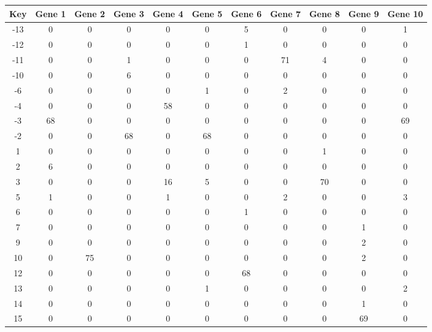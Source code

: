 \begin{tabular}{|c|c|c|c|c|c|c|c|c|c|c|}
\hline
Key & Gene 1 & Gene 2 & Gene 3 & Gene 4 & Gene 5 & Gene 6 & Gene 7 & Gene 8 & Gene 9 & Gene 10 \\
\hline
-13 & 0 & 0 & 0 & 0 & 0 & 5 & 0 & 0 & 0 & 1 \\
-12 & 0 & 0 & 0 & 0 & 0 & 1 & 0 & 0 & 0 & 0 \\
-11 & 0 & 0 & 1 & 0 & 0 & 0 & 71 & 4 & 0 & 0 \\
-10 & 0 & 0 & 6 & 0 & 0 & 0 & 0 & 0 & 0 & 0 \\
-6 & 0 & 0 & 0 & 0 & 1 & 0 & 2 & 0 & 0 & 0 \\
-4 & 0 & 0 & 0 & 58 & 0 & 0 & 0 & 0 & 0 & 0 \\
-3 & 68 & 0 & 0 & 0 & 0 & 0 & 0 & 0 & 0 & 69 \\
-2 & 0 & 0 & 68 & 0 & 68 & 0 & 0 & 0 & 0 & 0 \\
1 & 0 & 0 & 0 & 0 & 0 & 0 & 0 & 1 & 0 & 0 \\
2 & 6 & 0 & 0 & 0 & 0 & 0 & 0 & 0 & 0 & 0 \\
3 & 0 & 0 & 0 & 16 & 5 & 0 & 0 & 70 & 0 & 0 \\
5 & 1 & 0 & 0 & 1 & 0 & 0 & 2 & 0 & 0 & 3 \\
6 & 0 & 0 & 0 & 0 & 0 & 1 & 0 & 0 & 0 & 0 \\
7 & 0 & 0 & 0 & 0 & 0 & 0 & 0 & 0 & 1 & 0 \\
9 & 0 & 0 & 0 & 0 & 0 & 0 & 0 & 0 & 2 & 0 \\
10 & 0 & 75 & 0 & 0 & 0 & 0 & 0 & 0 & 2 & 0 \\
12 & 0 & 0 & 0 & 0 & 0 & 68 & 0 & 0 & 0 & 0 \\
13 & 0 & 0 & 0 & 0 & 1 & 0 & 0 & 0 & 0 & 2 \\
14 & 0 & 0 & 0 & 0 & 0 & 0 & 0 & 0 & 1 & 0 \\
15 & 0 & 0 & 0 & 0 & 0 & 0 & 0 & 0 & 69 & 0 \\
\hline
\end{tabular}